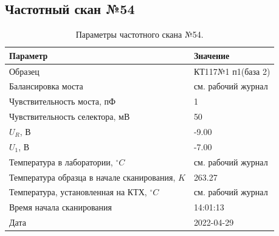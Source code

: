 \subsection{Частотный скан №54}
\begin{table}[!ht]
    \centering
    \caption{Параметры частотного скана №54.}
    \begin{tabular}{|l|l|}
        \hline
        Параметр                                       & Значение                  \\ \hline
        Образец                                        & КТ117№1 п1(база 2)        \\ \hline
        Балансировка моста                             & см. рабочий журнал        \\ \hline
        Чувствительность моста, пФ                     & 1                         \\ \hline
        Чувствительность селектора, мВ                 & 50                        \\ \hline
        $U_R$, В                                       & -9.00                     \\ \hline
        $U_1$, В                                       & -7.00                     \\ \hline
        Температура в лаборатории, $^\circ C$          & см. рабочий журнал        \\ \hline
        Температура образца в начале сканирования, $K$ & 263.27                    \\ \hline
        Температура, установленная на КТХ, $^\circ C$  & см. рабочий журнал        \\ \hline
        Время начала сканирования                      & 14:01:13                  \\ \hline
        Дата                                           & 2022-04-29                \\ \hline
    \end{tabular}
    \label{table:frequency_scan_54}
\end{table}

